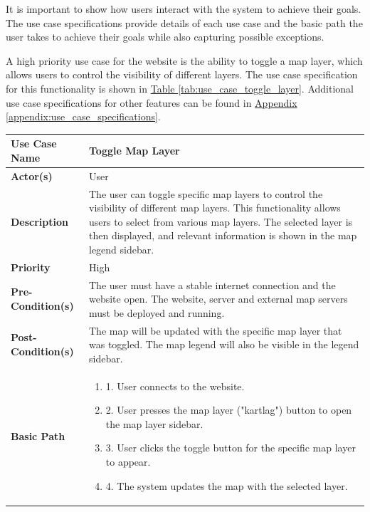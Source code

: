 It is important to show how users interact with the system to achieve their goals. The use case specifications provide details of each use case and the basic path the user takes to achieve their goals while also capturing possible exceptions. 

A high priority use case for the website is the ability to toggle a map layer, which allows users to control the visibility of different layers. The use case specification for this functionality is shown in \hyperref[tab:use_case_toggle_layer]{Table \ref*{tab:use_case_toggle_layer}}. Additional use case specifications for other features can be found in \hyperref[appendix:use_case_specifications]{Appendix \ref*{appendix:use_case_specifications}}.

\begin{table}[h]
    \centering
    \begin{tabularx}{\textwidth}{|l|X|}
        \hline
        \rowcolor{gray!20}
        \textbf{Use Case Name} & Toggle Map Layer \\
        \hline
        \textbf{Actor(s)} & User \\
        \hline
        \textbf{Description} & The user can toggle specific map layers to control the visibility of different map layers. This functionality allows users to select from various map layers. The selected layer is then displayed, and relevant information is shown in the map legend sidebar. \\
        \hline
        \textbf{Priority} & High \\
        \hline
        \textbf{Pre-Condition(s)} & The user must have a stable internet connection and the website open. The website, server and external map servers must be deployed and running.\\
        \hline
        \textbf{Post-Condition(s)} & The map will be updated with the specific map layer that was toggled. The map legend will also be visible in the legend sidebar. \\
        \hline
        \textbf{Basic Path} &  
        \begin{enumerate}[label=,left=0pt]
            \item 1. User connects to the website.
            \item 2. User presses the map layer ("kartlag") button to open the map layer sidebar.
            \item 3. User clicks the toggle button for the specific map layer to appear.
            \item 4. The system updates the map with the selected layer.

\end{enumerate}
\end{tabularx}
\end{table}
